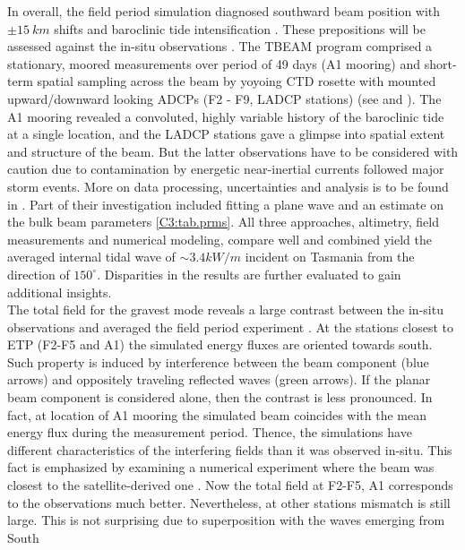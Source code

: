 \documentclass[12pt]{article}
\begin{document}
In overall, the field period simulation diagnosed southward beam position with $\pm 15~km$ shifts 
and baroclinic tide intensification . These prepositions will be 
assessed against the in-situ observations \citep{waterhouse2018observations}. The TBEAM program 
comprised a stationary, moored measurements over period of 49 days (A1 mooring) 
and short-term spatial sampling across the beam by yoyoing CTD rosette with mounted upward/downward 
looking ADCPs (F2 - F9, LADCP stations)  (see  and 
). The 
A1 mooring revealed a convoluted, highly variable history of the baroclinic tide at a single 
location, and the LADCP stations gave a glimpse into spatial extent and structure of the beam. 
But the latter observations have to be considered with caution due to contamination by 
energetic near-inertial currents followed major storm events. More on data processing, 
uncertainties and analysis is to be found in \citep{waterhouse2018observations}. Part of their   
investigation included fitting a plane wave and an estimate on the bulk beam parameters 
\ref{C3:tab.prms}. All three approaches, altimetry, field measurements and numerical modeling, 
compare well and combined yield the averaged internal tidal wave of $\sim 3.4 kW/m$ incident on 
Tasmania from the direction of $150^{\circ}$. Disparities in the results are further evaluated to 
gain additional insights.\\
The total field for the gravest mode  reveals a large contrast 
between the in-situ observations and averaged the field period experiment 
. At the stations closest to ETP (F2-F5 and 
A1) the simulated energy fluxes are oriented towards south. Such property is induced by 
interference between the beam component (blue arrows) and oppositely traveling reflected waves 
(green arrows). If the planar beam component  is considered alone, then 
the contrast is less pronounced. In fact, at location 
of A1 mooring the simulated beam coincides with the mean energy flux during the measurement period. 
Thence, the simulations have different characteristics of the interfering fields than it was 
observed in-situ. This fact is emphasized by examining a numerical experiment where the beam was 
closest to the satellite-derived one . Now the total field at 
F2-F5, A1 corresponds to the observations much better. Nevertheless, at other stations mismatch 
is still large. This is not surprising due to superposition with the waves emerging from South 
\end{document}
